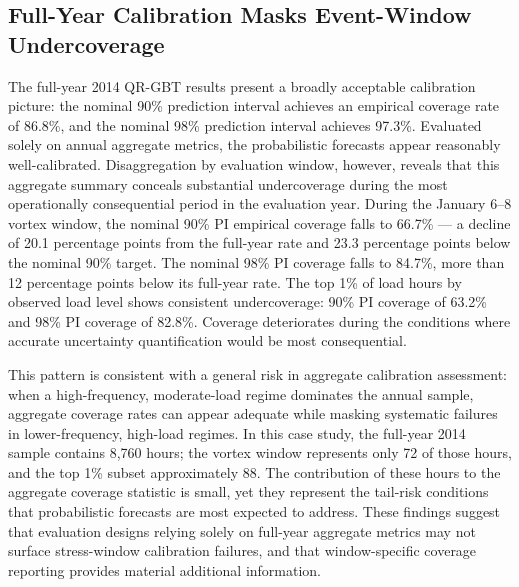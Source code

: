\documentclass[12pt,a4paper]{article}
\begin{document}
\subsection{Full-Year Calibration Masks Event-Window Undercoverage}
The full-year 2014 QR-GBT results present a broadly acceptable calibration picture: the nominal 90\% prediction interval achieves an empirical coverage rate of 86.8\%, and the nominal 98\% prediction interval achieves 97.3\%. Evaluated solely on annual aggregate metrics, the probabilistic forecasts appear reasonably well-calibrated. Disaggregation by evaluation window, however, reveals that this aggregate summary conceals substantial undercoverage during the most operationally consequential period in the evaluation year.
During the January 6–8 vortex window, the nominal 90\% PI empirical coverage falls to 66.7\% --- a decline of 20.1 percentage points from the full-year rate and 23.3 percentage points below the nominal 90\% target. The nominal 98\% PI coverage falls to 84.7\%, more than 12 percentage points below its full-year rate. The top 1\% of load hours by observed load level shows consistent undercoverage: 90\% PI coverage of 63.2\% and 98\% PI coverage of 82.8\%. Coverage deteriorates during the conditions where accurate uncertainty quantification would be most consequential.


This pattern is consistent with a general risk in aggregate calibration assessment: when a high-frequency, moderate-load regime dominates the annual sample, aggregate coverage rates can appear adequate while masking systematic failures in lower-frequency, high-load regimes. In this case study, the full-year 2014 sample contains 8,760 hours; the vortex window represents only 72 of those hours, and the top 1\% subset approximately 88. The contribution of these hours to the aggregate coverage statistic is small, yet they represent the tail-risk conditions that probabilistic forecasts are most expected to address. These findings suggest that evaluation designs relying solely on full-year aggregate metrics may not surface stress-window calibration failures, and that window-specific coverage reporting provides material additional information.
\end{document}

